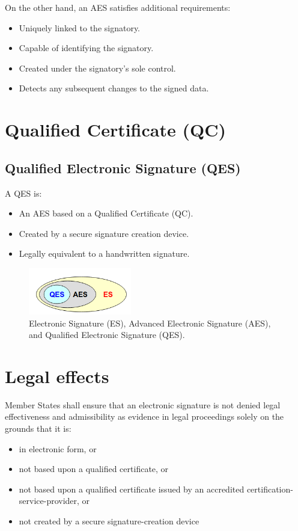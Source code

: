 On the other hand, an AES satisfies additional requirements:
\begin{itemize}
    \item Uniquely linked to the signatory.
    \item Capable of identifying the signatory.
    \item Created under the signatory's sole control.
    \item Detects any subsequent changes to the signed data.
\end{itemize}

\section{Qualified Certificate (QC)}


\subsection{Qualified Electronic Signature (QES)}
A QES is:
\begin{itemize}
    \item An AES based on a Qualified Certificate (QC).
    \item Created by a secure signature creation device.
    \item Legally equivalent to a handwritten signature.
\end{itemize}

\begin{figure}[H]
  \centering
  \includegraphics[width=0.4\textwidth]{img/es-aes-qus.png}
  \caption{Electronic Signature (ES), Advanced Electronic Signature
  (AES), and Qualified Electronic Signature (QES).}
\end{figure}

\section{Legal effects}
Member States shall ensure that an electronic signature is not denied
legal effectiveness and admissibility as evidence in legal proceedings
solely on the grounds that it is:
\begin{itemize}
  \item in electronic form, or
  \item not based upon a qualified certificate, or
  \item not based upon a qualified certificate issued by an accredited
    certification-service-provider, or
  \item not created by a secure signature-creation device
\end{itemize}


